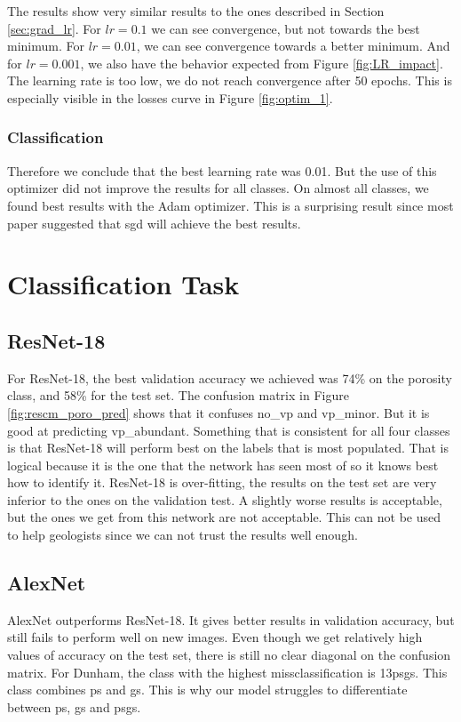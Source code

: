 The results show very similar results to the ones described in Section \ref{sec:grad_lr}. For \(lr=0.1\) we can see convergence, but not towards the best minimum. For \(lr=0.01\), we can see convergence towards a better minimum. And for \(lr=0.001\), we also have the behavior expected from Figure \ref{fig:LR_impact}. The learning rate is too low, we do not reach convergence after 50 epochs. This is especially visible in the losses curve in Figure \ref{fig:optim_1}. 

\subsubsection{Classification}
Therefore we conclude that the best learning rate was 0.01.
But the use of this optimizer did not improve the results for all classes. On almost all classes, we found best results with the Adam optimizer. This is a surprising result since most paper suggested that \gls{sgd} will achieve the best results. 

\section{Classification Task}
\subsection{ResNet-18}
For ResNet-18, the best validation accuracy we achieved was 74\% on the porosity class, and 58\% for the test set. The confusion matrix in Figure \ref{fig:rescm_poro_pred} shows that it confuses no\_vp and vp\_minor. But it is good at predicting vp\_abundant. Something that is consistent for all four classes is that ResNet-18 will perform best on the labels that is most populated. That is logical because it is the one that the network has seen most of so it knows best how to identify it. ResNet-18 is \gls{over-fitting}, the results on the test set are very inferior to the ones on the validation test. A slightly worse results is acceptable, but the ones we get from this network are not acceptable. This can not be used to help geologists since we can not trust the results well enough.

\subsection{AlexNet}
AlexNet outperforms ResNet-18. It gives better results in validation accuracy, but still fails to perform well on new images. Even though we get relatively high values of accuracy on the test set, there is still no clear diagonal on the confusion matrix. For Dunham, the class with the highest missclassification is 13\gls{psgs}. This class combines \gls{ps} and \gls{gs}. This is why our model struggles to differentiate between \gls{ps}, \gls{gs} and \gls{psgs}. 

